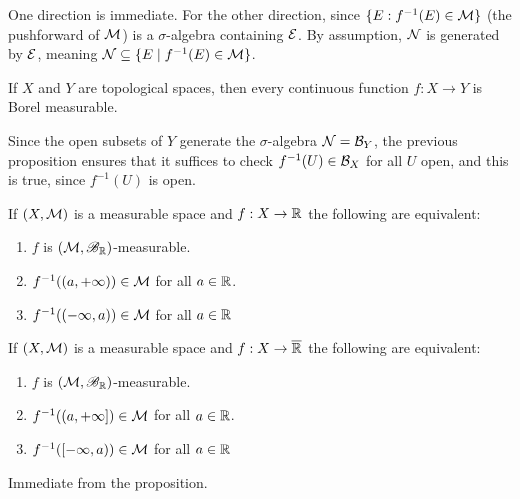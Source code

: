 \documentclass[x11names,reqno,14pt]{extarticle}
\newcommand*{\oo}{\infty}
\begin{document}
\proof

One direction is immediate. For the other direction, since $\{E: f^{-1}(E) \in \mathcal{M}\}$ (the pushforward of $\mathcal{M}$) is a $\sigma$-algebra containing $\mathcal{E}$. By assumption, $\mathcal{N}$ is generated by $\mathcal{E}$, meaning $\mathcal{N} \subseteq \{E \mid f^{-1}(E) \in \mathcal{M} \}$. 

\cor

If $X$ and $Y$ are topological spaces, then every continuous function $f:X\to Y$ is Borel measurable. 

\proof 

Since the open subsets of $Y$ generate the $\sigma$-algebra $\mathcal{N} = \mathcal{B}_Y$, the previous proposition ensures that it suffices to check $f^{-1}(U)\in\mathcal{B}_X$ for all $U$ open, and this is true, since $f^{-1}(U)$ is open. 

\cor

If $(X, \mathcal{M})$ is a measurable space and $f:X\to\mathbb{R}$ the following are equivalent: 
\begin{enumerate}[label=(\roman*)]
\item $f$ is $(\mathcal{M}, \mathscr{B}_{\mathbb{R}})$-measurable. 
\item $f^{-1}((a, + \oo))\in\mc{M}$ for all $a \in \mathbb{R}$. 
\item $f^{-1}((-\oo, a)) \in \mc{M}$ for all $a \in \mathbb{R}$
\end{enumerate}

If $(X, \mathcal{M})$ is a measurable space and $f:X\to\overline{\mathbb{R}}$ the following are equivalent: 
\begin{enumerate}[label=(\roman*)]
\item $f$ is $(\mathcal{M}, \mathscr{B}_{\mathbb{R}})$-measurable. 
\item $f^{-1}((a, + \oo])\in\mc{M}$ for all $a \in \mathbb{R}$. 
\item $f^{-1}([-\oo, a)) \in \mc{M}$ for all $a \in \mathbb{R}$
\end{enumerate}

\proof

Immediate from the proposition.
\end{document}

